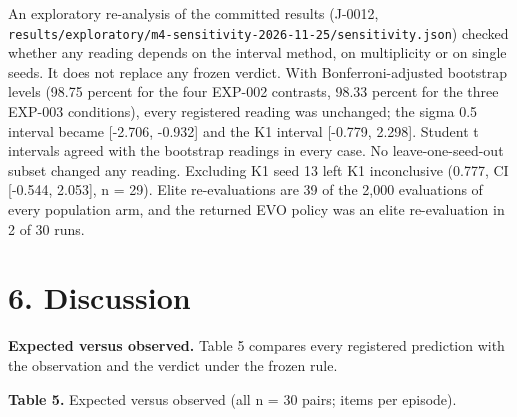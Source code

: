 \documentclass[
]{article}
\begin{document}
An exploratory re-analysis of the committed results (J-0012,
\texttt{results/exploratory/m4-sensitivity-2026-11-25/sensitivity.json})
checked whether any reading depends on the interval method, on
multiplicity or on single seeds. It does not replace any frozen verdict.
With Bonferroni-adjusted bootstrap levels (98.75 percent for the four
EXP-002 contrasts, 98.33 percent for the three EXP-003 conditions),
every registered reading was unchanged; the sigma 0.5 interval became
{[}-2.706, -0.932{]} and the K1 interval {[}-0.779, 2.298{]}. Student t
intervals agreed with the bootstrap readings in every case. No
leave-one-seed-out subset changed any reading. Excluding K1 seed 13 left
K1 inconclusive (0.777, CI {[}-0.544, 2.053{]}, n = 29). Elite
re-evaluations are 39 of the 2,000 evaluations of every population arm,
and the returned EVO policy was an elite re-evaluation in 2 of 30 runs.

\section{6. Discussion}\label{discussion}

\textbf{Expected versus observed.} Table 5 compares every registered
prediction with the observation and the verdict under the frozen rule.

\textbf{Table 5.} Expected versus observed (all n = 30 pairs; items per
episode).
\end{document}
